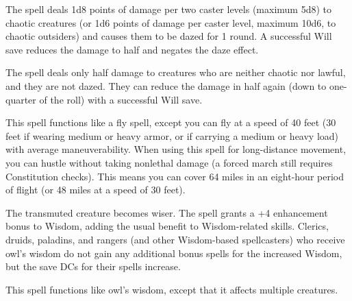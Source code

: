 \begin{multicols}{2}
\begin{small}
\smallskip\noindent The spell deals 1d8 points of damage per two caster levels (maximum 5d8) to chaotic creatures (or 1d6 points of damage per caster level, maximum 10d6, to chaotic outsiders) and causes them to be dazed for 1 round. A successful Will save reduces the damage to half and negates the daze effect.

\smallskip\noindent The spell deals only half damage to creatures who are neither chaotic nor lawful, and they are not dazed. They can reduce the damage in half again (down to one-quarter of the roll) with a successful Will save.

\noindent This spell functions like a fly spell, except you can fly at a speed of 40 feet (30 feet if wearing medium or heavy armor, or if carrying a medium or heavy load) with average maneuverability. When using this spell for long-distance movement, you can hustle without taking nonlethal damage (a forced march still requires Constitution checks). This means you can cover 64 miles in an eight-hour period of flight (or 48 miles at a speed of 30 feet).

\noindent The transmuted creature becomes wiser. The spell grants a +4 enhancement bonus to Wisdom, adding the usual benefit to Wisdom-related skills. Clerics, druids, paladins, and rangers (and other Wisdom-based spellcasters) who receive owl's wisdom do not gain any additional bonus spells for the increased Wisdom, but the save DCs for their spells increase.


\noindent This spell functions like owl's wisdom, except that it affects multiple creatures.


\end{small}
\end{multicols}

